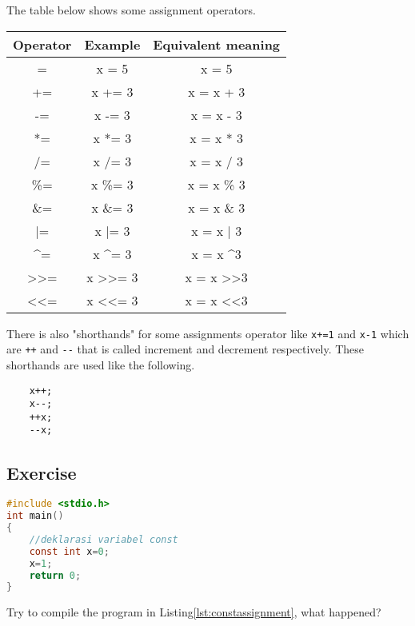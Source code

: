 The table below shows some assignment operators.
\begin{center}
	\begin{tabular}{|c|c|c|}
		\hline
		\multicolumn{1}{|l|}{Operator} & \multicolumn{1}{l|}{Example}       & \multicolumn{1}{l|}{Equivalent meaning}  \\ \hline
		=   & x = 5   & x = 5      \\ \hline
		+=  & x += 3  & x = x + 3  \\ \hline
		-=  & x -= 3  & x = x - 3  \\ \hline
		*=  & x *= 3  & x = x * 3  \\ \hline
		/=  & x /= 3  & x = x / 3  \\ \hline
		\%= & x \%= 3 & x = x \% 3 \\ \hline
		\&= & x \&= 3 & x = x \& 3 \\ \hline
		|=  & x |= 3  & x = x | 3  \\ \hline
		\textasciicircum{}=            & x \textasciicircum{}= 3           & x = x \textasciicircum 3           \\ \hline
		\textgreater{}\textgreater{}=  & x \textgreater{}\textgreater{}= 3 & x = x \textgreater{}\textgreater 3 \\ \hline
		\textless{}\textless{}=        & x \textless{}\textless{}= 3       & x = x \textless{}\textless 3       \\ \hline
	\end{tabular}
\end{center}
There is also "shorthands" for some assignments operator like \verb*|x+=1| and \verb*|x-1| which are \verb*|++| and \verb*|--| that is called increment and decrement respectively.
These shorthands are used like the following.
\begin{verbatim}
    x++;
    x--;
    ++x;
    --x;
\end{verbatim}


\subsection{Exercise}
\begin{lstlisting}[language=c,caption=Using assignment operator on const variable,label=lst:constassignment,captionpos=t]
#include <stdio.h>
int main()
{
    //deklarasi variabel const
    const int x=0;
    x=1;
	return 0;
}
\end{lstlisting} 
Try to compile the program in Listing\ref{lst:constassignment}, what happened?










